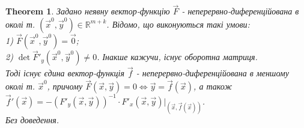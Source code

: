 \documentclass[a4paper, 10pt]{article}
\theoremstyle{theoremdd}
\newtheorem{theorem}{Theorem}[subsection]
\theoremstyle{theoremdd}
\theoremstyle{theoremdd}
\theoremstyle{theoremdd}
\theoremstyle{theoremdd}
\theoremstyle{theoremdd}
\theoremstyle{theoremdd}
\theoremstyle{theoremdd}
\begin{document}
\begin{theorem}
Задано неявну вектор-функцію $\vec{F}$ - неперервно-диференційована в околі т. $(\vec{x}^0, \vec{y}^0) \in \mathbb{R}^{m+k}$. Відомо, що виконуються такі умови:\\
1) $\vec{F}(\vec{x}^0,\vec{y}^0) = \vec{0}$;\\
2) $\det \vec{F}'_y (\vec{x}^0,\vec{y}^0) \neq 0$. Інакше кажучи, існує оборотна матриця.\\
Тоді існує єдина вектор-функція $\vec{f}$ - неперервно-диференційована в меншому околі т. $\vec{x}^0$, причому $\vec{F}(\vec{x},\vec{y}) = 0 \iff \vec{y} = \vec{f}(\vec{x})$, а також $\vec{f}'(\vec{x}) = -(F'_y(\vec{x},\vec{y}))^{-1} \cdot F'_x (\vec{x},\vec{y}) \Big|_{(\vec{x}, \vec{f}(\vec{x}))}$.\\
\textit{Без доведення.}
\end{theorem}
\end{document}
